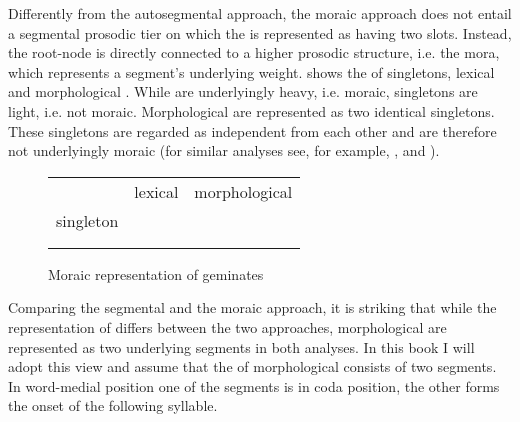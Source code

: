 Differently from the autosegmental approach, the moraic approach does not entail a segmental prosodic tier on which the  is represented as having two slots. Instead, the root-node is directly connected to a higher prosodic structure, i.e. the mora, which represents a segment's underlying weight.  shows the  of singletons, lexical and morphological . While  are underlyingly heavy, i.e. moraic, singletons are light, i.e. not moraic. Morphological  are represented as two identical singletons. These singletons are regarded as independent from each other and are therefore not underlyingly moraic  (for similar analyses see, for example,  \citealt[14]{Ham.2001}, \citealt[17]{Davis.2014} and \citealt{Davis.2017}).


\begin{figure} [h]
	\centering
	
	
	\begin{tabularx}{.8\linewidth}{YYY}
		
		&		lexical			 & 		 morphological \\
		
		singleton	&			  \isi{geminate}	 & 			  \\		
		\\
		\begin{tikzpicture}
		\Tree [.C  ] 					
		\end{tikzpicture}												&
		
		
		\begin{tikzpicture}[grow'=up]
		\Tree  [.C $\mu$ ]
		\end{tikzpicture}			
		&
		
		\begin{tikzpicture}[grow'=up]
		\Tree  [.C ]
		\end{tikzpicture}
		\begin{tikzpicture}[grow'=up]
		\Tree  [.C  ]
		\end{tikzpicture}		
		
	\end{tabularx}
	
	\caption{Moraic representation of geminates} 
	\label{fig:Moraic representation of geminates}
\end{figure}


Comparing the segmental and the moraic approach, it is striking that while the representation of  differs between the two approaches, morphological  are represented as two underlying segments in both analyses.
In this book I will adopt this view and assume that the  of morphological  consists of two segments. In word-medial position one of the segments is in coda position, the other forms the onset of the following syllable. 


